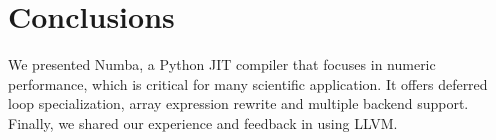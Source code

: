 \documentclass{acm_proc_article-sp}
\begin{document}
\section{Conclusions}

We presented Numba, a Python JIT compiler that focuses in numeric
performance, which is critical for many scientific application. It offers
deferred loop specialization, array expression rewrite and multiple backend
support. Finally, we shared our experience and feedback in using LLVM.



%

%
%


\end{document}
